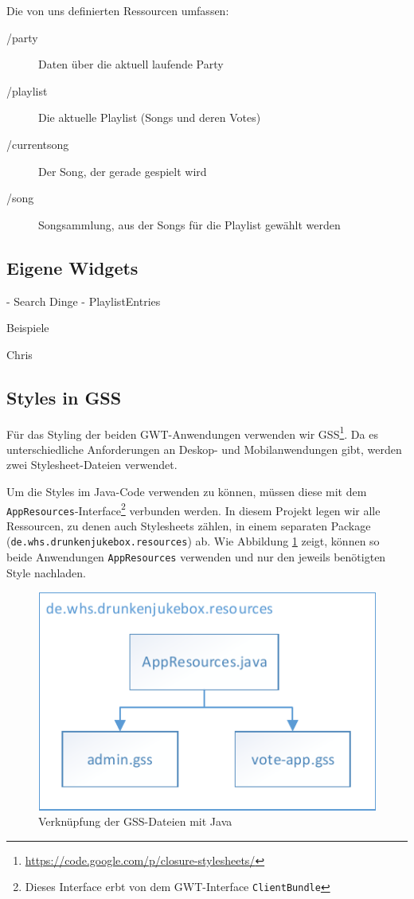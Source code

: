 Die von uns definierten Ressourcen umfassen:
\begin{description}
	\item[/party] Daten über die aktuell laufende Party
	\item[/playlist] Die aktuelle Playlist (Songs und deren Votes)
	\item[/currentsong] Der Song, der gerade gespielt wird
	\item[/song] Songsammlung, aus der Songs für die Playlist gewählt werden
\end{description}

\subsection{Eigene Widgets}
- Search Dinge
- PlaylistEntries

Beispiele

Chris

\subsection{Styles in GSS}
Für das Styling der beiden GWT-Anwendungen verwenden wir GSS\footnote{\url{https://code.google.com/p/closure-stylesheets/}}. Da es unterschiedliche Anforderungen
an Deskop- und Mobilanwendungen gibt, werden zwei Stylesheet-Dateien verwendet.

Um die Styles im Java-Code verwenden zu können, müssen diese mit dem \texttt{AppResources}-Interface\footnote{Dieses Interface erbt von dem GWT-Interface \texttt{ClientBundle}} verbunden werden.
In diesem Projekt legen wir alle Ressourcen, zu denen auch Stylesheets zählen, in
einem separaten Package (\texttt{de.whs.drunkenjukebox.resources}) ab. Wie Abbildung
\ref{fig:GSS} zeigt, können so beide Anwendungen \texttt{AppResources} verwenden
und nur den jeweils benötigten Style nachladen.

\begin{figure}[tbh]
\centering
\includegraphics[width=0.6\linewidth]{Bilder/GSS}
\caption{Verknüpfung der GSS-Dateien mit Java}
\label{fig:GSS}
\end{figure}


